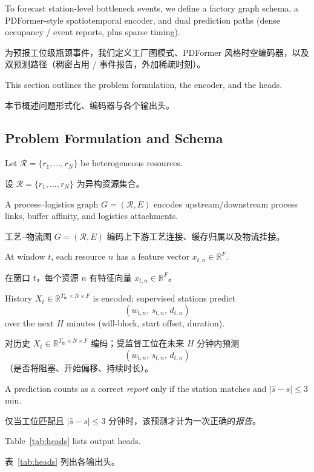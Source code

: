 \documentclass[12pt,a4paper,oneside,scheme=plain]{ctexrep}
\newcommand{\bip}[2]{%
  \par #1\par
  \nobreak\vspace{0.12em}%
  {\small\color{black!62}#2}\par
  \vspace{0.62em}%
}
\begin{document}
\bip
{To forecast station-level bottleneck events, we define a factory graph schema, a PDFormer-style spatiotemporal encoder, and dual prediction paths (dense occupancy / event reports, plus sparse timing).}
{为预报工位级瓶颈事件，我们定义工厂图模式、PDFormer 风格时空编码器，以及双预测路径（稠密占用 / 事件报告，外加稀疏时刻）。}

\bip
{This section outlines the problem formulation, the encoder, and the heads.}
{本节概述问题形式化、编码器与各个输出头。}

\subsection[Problem Formulation and Schema / 问题形式化与模式]{Problem Formulation and Schema}
\label{sec:schema}

\bip
{Let $\mathcal{R}=\{r_1,\ldots,r_N\}$ be heterogeneous resources.}
{设 $\mathcal{R}=\{r_1,\ldots,r_N\}$ 为异构资源集合。}

\bip
{A process--logistics graph $G=(\mathcal{R},E)$ encodes upstream/downstream process links, buffer affinity, and logistics attachments.}
{工艺--物流图 $G=(\mathcal{R},E)$ 编码上下游工艺连接、缓存归属以及物流挂接。}

\bip
{At window $t$, each resource $n$ has a feature vector $x_{t,n}\in\mathbb{R}^{F}$.}
{在窗口 $t$，每个资源 $n$ 有特征向量 $x_{t,n}\in\mathbb{R}^{F}$。}

\bip
{History $X_t\in\mathbb{R}^{T_{\mathrm{in}}\times N\times F}$ is encoded; supervised stations predict
\[
(w_{t,n},\, s_{t,n},\, d_{t,n})
\]
over the next $H$ minutes (will-block, start offset, duration).}
{对历史 $X_t\in\mathbb{R}^{T_{\mathrm{in}}\times N\times F}$ 编码；受监督工位在未来 $H$ 分钟内预测
\[
(w_{t,n},\, s_{t,n},\, d_{t,n})
\]
（是否将阻塞、开始偏移、持续时长）。}

\bip
{A prediction counts as a correct \emph{report} only if the station matches and $|\hat{s}-s|\le 3$\,min.}
{仅当工位匹配且 $|\hat{s}-s|\le 3$ 分钟时，该预测才计为一次正确的\emph{报告}。}

\bip
{Table~\ref{tab:heads} lists output heads.}
{表~\ref{tab:heads} 列出各输出头。}
\end{document}

